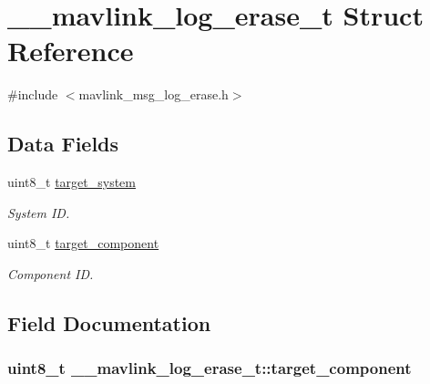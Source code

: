 \hypertarget{struct____mavlink__log__erase__t}{\section{\+\_\+\+\_\+mavlink\+\_\+log\+\_\+erase\+\_\+t Struct Reference}
\label{struct____mavlink__log__erase__t}
}


{\ttfamily \#include $<$mavlink\+\_\+msg\+\_\+log\+\_\+erase.\+h$>$}

\subsection*{Data Fields}
\begin{DoxyCompactItemize}
\item 
uint8\+\_\+t \hyperlink{struct____mavlink__log__erase__t_a14ad33c6f385ca92af726e60febc8a56}{target\+\_\+system}
\begin{DoxyCompactList}\small\item\em System I\+D. \end{DoxyCompactList}\item 
uint8\+\_\+t \hyperlink{struct____mavlink__log__erase__t_a3ffafb59a268d98d89ed5d2df9209316}{target\+\_\+component}
\begin{DoxyCompactList}\small\item\em Component I\+D. \end{DoxyCompactList}\end{DoxyCompactItemize}


\subsection{Field Documentation}
\hypertarget{struct____mavlink__log__erase__t_a3ffafb59a268d98d89ed5d2df9209316}{
\subsubsection[{target\+\_\+component}]{\setlength{\rightskip}{0pt plus 5cm}uint8\+\_\+t \+\_\+\+\_\+mavlink\+\_\+log\+\_\+erase\+\_\+t\+::target\+\_\+component}}\label{struct____mavlink__log__erase__t_a3ffafb59a268d98d89ed5d2df9209316}


